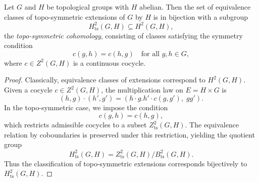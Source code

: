 \documentclass[10pt,a4paper]{amsart}
\begin{document}
	\begin{theorem}
		Let $G$ and $H$ be topological groups with $H$ abelian.  
		Then the set of equivalence classes of topo-symmetric extensions of $G$ by $H$ is in bijection with a subgroup
		\[
		H^2_{\mathrm{ts}}(G,H) \subseteq H^2(G,H),
		\]
		the \emph{topo-symmetric cohomology}, consisting of classes satisfying the symmetry condition
		\[
		c(g,h) = c(h,g) \quad \text{for all } g,h \in G,
		\]
		where $c \in Z^2(G,H)$ is a continuous cocycle.
	\end{theorem}

	\begin{proof}
		Classically, equivalence classes of extensions correspond to $H^2(G,H)$.  
		Given a cocycle $c \in Z^2(G,H)$, the multiplication law on $E = H \times G$ is
		\[
		(h,g) \cdot (h',g') = (h \cdot g.h' \cdot c(g,g'),\; gg').
		\]
		In the topo-symmetric case, we impose the condition
		\[
		c(g,h) = c(h,g),
		\]
		which restricts admissible cocycles to a subset $Z^2_{\mathrm{ts}}(G,H)$.  
		The equivalence relation by coboundaries is preserved under this restriction, yielding the quotient group
		\[
		H^2_{\mathrm{ts}}(G,H) = Z^2_{\mathrm{ts}}(G,H)/B^2_{\mathrm{ts}}(G,H).
		\]
		Thus the classification of topo-symmetric extensions corresponds bijectively to $H^2_{\mathrm{ts}}(G,H)$.  
	\end{proof}
\end{document}
